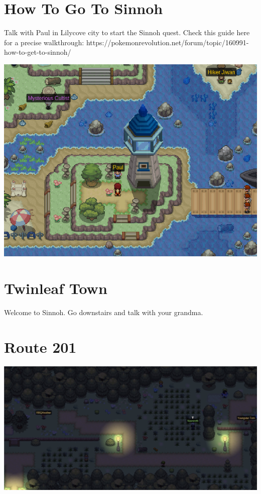 \documentclass[11pt]{article}
\begin{document}
\section{How To Go To Sinnoh}\label{sec:how-to-go-to-sinnoh}
Talk with Paul in Lilycove city to start the Sinnoh quest.
Check this guide here for a precise walkthrough:
https://pokemonrevolution.net/forum/topic/160991-how-to-get-to-sinnoh/

\includegraphics[width=\textwidth]{walkthrough/Sinnoh/paul-lilycove}

\section{Twinleaf Town}\label{sec:twinleaf-town}
Welcome to Sinnoh.
Go downstairs and talk with your grandma.

\section{Route 201}\label{sec:Route_201}
\includegraphics[width=\textwidth]{walkthrough/Sinnoh/Route_201}
\end{document}
